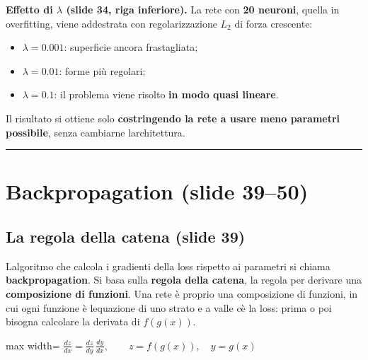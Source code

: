 \documentclass[11pt,a4paper,oneside,openany]{book}
\providecommand{\tightlist}{\setlength{\itemsep}{0pt}\setlength{\parskip}{0pt}}
\begin{document}
\textbf{Effetto di \(\lambda\) (slide 34, riga inferiore).} La rete con \textbf{20 neuroni}, quella in overfitting, viene addestrata con regolarizzazione \(L_2\) di forza crescente:

\begin{itemize}
\tightlist
\item
  \(\lambda = 0.001\): superficie ancora frastagliata;
\item
  \(\lambda = 0.01\): forme più regolari;
\item
  \(\lambda = 0.1\): il problema viene risolto \textbf{in modo quasi lineare}.
\end{itemize}

Il risultato si ottiene solo \textbf{costringendo la rete a usare meno parametri possibile}, senza cambiarne l\textquotesingle architettura.

\begin{center}\rule{0.5\linewidth}{0.5pt}\end{center}

\section{Backpropagation (slide 39--50)}\label{f01-r727}

\subsection{La regola della catena (slide 39)}\label{f01-r729}

L\textquotesingle algoritmo che calcola i gradienti della loss rispetto ai parametri si chiama \textbf{backpropagation}. Si basa sulla \textbf{regola della catena}, la regola per derivare una \textbf{composizione di funzioni}. Una rete è proprio una composizione di funzioni, in cui ogni funzione è l\textquotesingle equazione di uno strato e a valle c\textquotesingle è la loss: prima o poi bisogna calcolare la derivata di \(f(g(x))\).

\begin{center}
\begin{adjustbox}{max width=\linewidth}
$\displaystyle 
\boxed{\frac{dz}{dx} = \frac{dz}{dy}\,\frac{dy}{dx}}, \qquad z = f(g(x)),\quad y = g(x)
$
\end{adjustbox}
\end{center}
\end{document}
